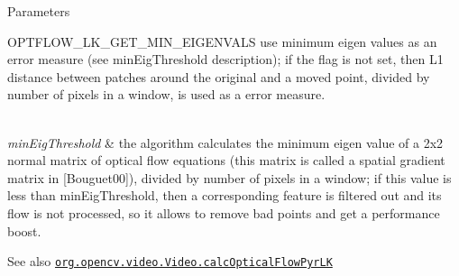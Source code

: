 \begin{DoxyParams}{Parameters}
\begin{DoxyItemize}
\item O\+P\+T\+F\+L\+O\+W\+\_\+\+L\+K\+\_\+\+G\+E\+T\+\_\+\+M\+I\+N\+\_\+\+E\+I\+G\+E\+N\+V\+A\+LS use minimum eigen values as an error measure (see {\ttfamily min\+Eig\+Threshold} description); if the flag is not set, then L1 distance between patches around the original and a moved point, divided by number of pixels in a window, is used as a error measure. 
\end{DoxyItemize}\\
\hline
{\em min\+Eig\+Threshold} & the algorithm calculates the minimum eigen value of a 2x2 normal matrix of optical flow equations (this matrix is called a spatial gradient matrix in \mbox{[}Bouguet00\mbox{]}), divided by number of pixels in a window; if this value is less than {\ttfamily min\+Eig\+Threshold}, then a corresponding feature is filtered out and its flow is not processed, so it allows to remove bad points and get a performance boost.\\
\hline
\end{DoxyParams}
\begin{DoxySeeAlso}{See also}
\href{http://docs.opencv.org/modules/video/doc/motion_analysis_and_object_tracking.html#calcopticalflowpyrlk}{\tt org.\+opencv.\+video.\+Video.\+calc\+Optical\+Flow\+Pyr\+LK} 
\end{DoxySeeAlso}
\mbox{\label{classorg_1_1opencv_1_1video_1_1_video_a009d13895ec508ed780d60688d850b4c}} 
